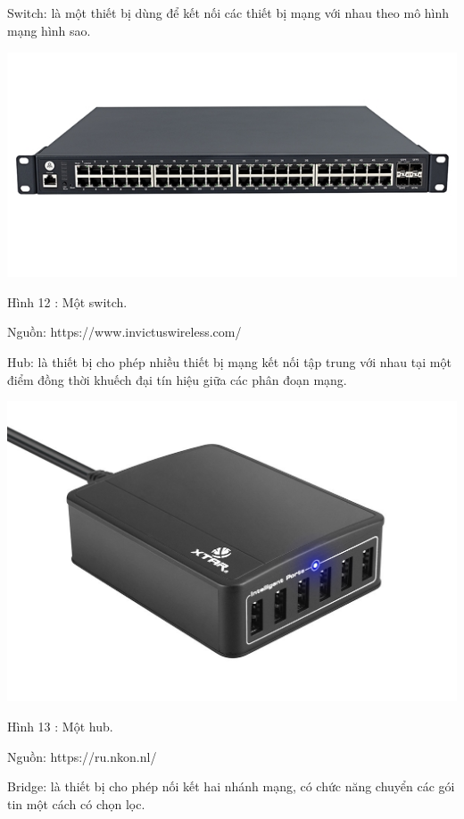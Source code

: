\documentclass{report}
\begin{document}
Switch: là một thiết bị dùng để kết nối các thiết bị mạng với nhau theo mô hình mạng hình sao.

\begin{center}
     \includegraphics[scale=0.5]{switch}
\end{center}
\centerline{Hình 12 : Một switch.}
\changefontsizes{12pt}
\centerline{Nguồn: https://www.invictuswireless.com/}
\changefontsizes{13pt}
\bigskip


Hub: là thiết bị cho phép nhiều thiết bị mạng kết nối tập trung với nhau tại một điểm đồng thời khuếch đại tín hiệu giữa các phân đoạn mạng.

\begin{center}
     \includegraphics[scale=0.2]{hub}
\end{center}
\centerline{Hình 13 : Một hub.}
\changefontsizes{12pt}
\centerline{Nguồn: https://ru.nkon.nl/}
\changefontsizes{13pt}
\bigskip

\newpage
Bridge: là thiết bị cho phép nối kết hai nhánh mạng, có chức năng chuyển các gói tin một cách có chọn lọc. 
\end{document}
